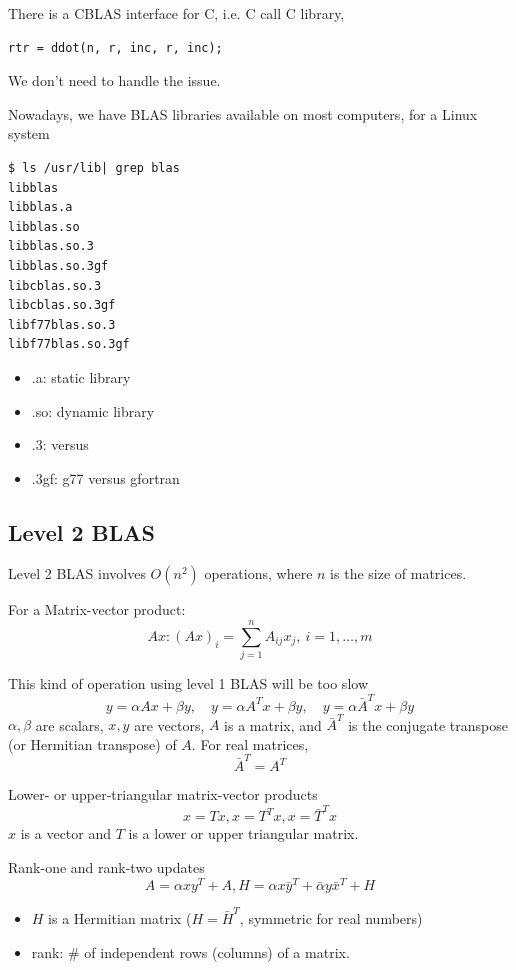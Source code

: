 There is a CBLAS interface for C, i.e. C call C library, 
\begin{verbatim}
rtr = ddot(n, r, inc, r, inc);
\end{verbatim}
We don't need to handle the issue.

Nowadays, we have BLAS libraries available on most computers, for a Linux system 
\begin{verbatim}
$ ls /usr/lib| grep blas
libblas
libblas.a
libblas.so
libblas.so.3
libblas.so.3gf
libcblas.so.3
libcblas.so.3gf
libf77blas.so.3
libf77blas.so.3gf    
\end{verbatim}
\begin{itemize}
    \item .a: static library 
    \item .so: dynamic library
    \item .3: versus 
    \item .3gf: g77 versus gfortran
\end{itemize}

\subsection{Level 2 BLAS}

Level 2 BLAS involves $O(n^2)$ operations, where $n$ is
the size of matrices.

\begin{eg}
    For a Matrix-vector product:
    \[
        Ax: (Ax)_i = \sum_{j=1}^n A_{ij} x_j,\ i = 1, \ldots, m 
    \]
\end{eg}
This kind of operation using level 1 BLAS will be too slow
\[
    y = \alpha Ax + \beta y,\quad y = \alpha A^T x + \beta y,\quad y = \alpha \bar{A}^T x + \beta y  
\]
$\alpha, \beta$ are scalars, $x, y$ are vectors, $A$ is a matrix, and $\bar{A}^T$ is the conjugate transpose (or Hermitian transpose) of $A$. For real matrices,
\[
\bar{A}^T = A^T
\]

Lower- or upper-triangular matrix-vector products
\[
  x = Tx, x = T^T x , x = \bar{T}^T x
\]
$x$ is a vector and $T$ is a lower or upper triangular matrix.

\begin{eg}
    Rank-one and rank-two updates
    \[
        A = \alpha x y^T + A, H = \alpha x \bar{y}^T + \bar{\alpha} y \bar{x}^T + H
    \]
\end{eg}

\begin{itemize}
    \item $H$ is a Hermitian matrix ($H = \bar{H}^T$, symmetric for real numbers)
    \item rank: \# of independent rows (columns) of a matrix.
\end{itemize}

